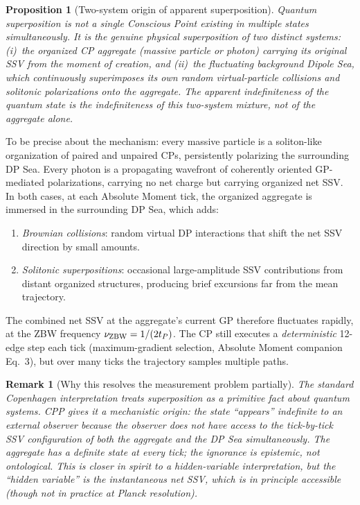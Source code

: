 \documentclass[12pt]{article}
\newtheorem{proposition}[theorem]{Proposition}
\newtheorem{remark}[theorem]{Remark}
\newcommand{\tP}{t_P}
\begin{document}
\begin{proposition}[Two-system origin of apparent superposition]
\label{prop:superposition}
Quantum superposition is not a single Conscious Point existing in multiple
states simultaneously.  It is the genuine physical superposition of two
distinct systems: (i)~the organized CP aggregate (massive particle or photon)
carrying its original SSV from the moment of creation, and (ii)~the
fluctuating background Dipole Sea, which continuously superimposes its own
random virtual-particle collisions and solitonic polarizations onto the
aggregate.  The apparent indefiniteness of the quantum state is the
indefiniteness of this two-system mixture, not of the aggregate alone.
\end{proposition}

To be precise about the mechanism: every massive particle is a soliton-like
organization of paired and unpaired CPs, persistently polarizing the
surrounding DP Sea.  Every photon is a propagating wavefront of coherently
oriented GP-mediated polarizations, carrying no net charge but carrying
organized net SSV.  In both cases, at each Absolute Moment tick, the
organized aggregate is immersed in the surrounding DP Sea, which adds:
\begin{enumerate}[noitemsep]
  \item \emph{Brownian collisions}: random virtual DP interactions that
    shift the net SSV direction by small amounts.
  \item \emph{Solitonic superpositions}: occasional large-amplitude SSV
    contributions from distant organized structures, producing brief
    excursions far from the mean trajectory.
\end{enumerate}
The combined net SSV at the aggregate's current GP therefore fluctuates
rapidly, at the ZBW frequency $\nu_{\rm ZBW} = 1/(2\tP)$.  The CP still
executes a \emph{deterministic} 12-edge step each tick (maximum-gradient
selection, Absolute Moment companion Eq.~3), but over many ticks the
trajectory samples multiple paths.

\begin{remark}[Why this resolves the measurement problem partially]
The standard Copenhagen interpretation treats superposition as a primitive
fact about quantum systems.  CPP gives it a mechanistic origin: the state
``appears'' indefinite to an external observer because the observer does not
have access to the tick-by-tick SSV configuration of both the aggregate and
the DP Sea simultaneously.  The aggregate has a definite state at every tick;
the ignorance is epistemic, not ontological.  This is closer in spirit to a
hidden-variable interpretation, but the ``hidden variable'' is the
instantaneous net SSV, which is in principle accessible (though not in
practice at Planck resolution).
\end{remark}
\end{document}
